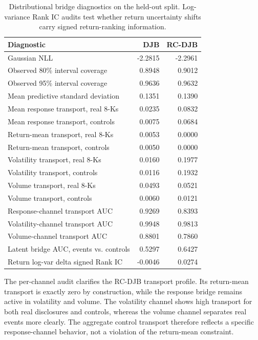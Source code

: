 \documentclass[10pt,letterpaper]{article}
\begin{document}
\begin{table}[H]
\centering
\caption{Distributional bridge diagnostics on the held-out split. Log-variance Rank IC audits test
whether return uncertainty shifts carry signed return-ranking information.}
\label{tab:diagnostics}
\small
\begin{tabular}{lrr}
\toprule
Diagnostic & DJB & RC-DJB \\
\midrule
Gaussian NLL & -2.2815 & -2.2961 \\
Observed 80\% interval coverage & 0.8948 & 0.9012 \\
Observed 95\% interval coverage & 0.9636 & 0.9632 \\
Mean predictive standard deviation & 0.1351 & 0.1390 \\
Mean response transport, real 8-Ks & 0.0235 & 0.0832 \\
Mean response transport, controls & 0.0075 & 0.0684 \\
Return-mean transport, real 8-Ks & 0.0053 & 0.0000 \\
Return-mean transport, controls & 0.0050 & 0.0000 \\
Volatility transport, real 8-Ks & 0.0160 & 0.1977 \\
Volatility transport, controls & 0.0116 & 0.1932 \\
Volume transport, real 8-Ks & 0.0493 & 0.0521 \\
Volume transport, controls & 0.0060 & 0.0121 \\
Response-channel transport AUC & 0.9269 & 0.8393 \\
Volatility-channel transport AUC & 0.9948 & 0.9813 \\
Volume-channel transport AUC & 0.8801 & 0.7860 \\
Latent bridge AUC, events vs. controls & 0.5297 & 0.6427 \\
Return log-var delta signed Rank IC & -0.0046 & 0.0274 \\
\bottomrule
\end{tabular}
\end{table}

The per-channel audit clarifies the RC-DJB transport profile. Its return-mean transport is exactly
zero by construction, while the response bridge remains active in volatility and volume. The
volatility channel shows high transport for both real disclosures and controls, whereas the volume
channel separates real events more clearly. The aggregate control transport therefore reflects a
specific response-channel behavior, not a violation of the return-mean constraint.
\end{document}
